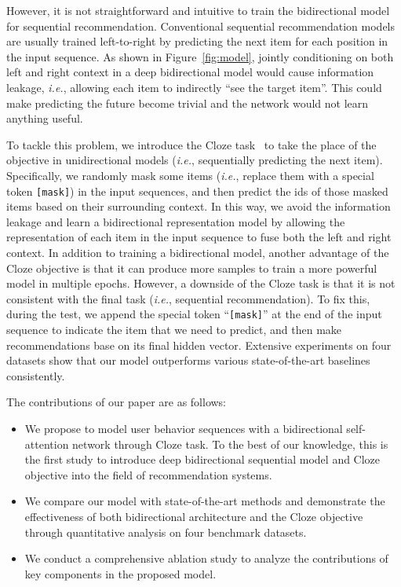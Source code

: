 However, it is not straightforward and intuitive to train the bidirectional model for sequential recommendation. Conventional sequential recommendation models are usually trained left-to-right by predicting the next item for each position in the input sequence. As shown in Figure~\ref{fig:model}, jointly conditioning on both left and right context in a deep bidirectional model would cause information leakage, \textit{i.e.}, allowing each item to indirectly ``see the target item''. This could make predicting the future become trivial and the network would not learn anything useful.

To tackle this problem, we introduce the Cloze task~\cite{Devlin:2018:BERT,Wilson:Cloze} to take the place of the objective in unidirectional models (\textit{i.e.}, sequentially predicting the next item). Specifically, we randomly mask some items (\textit{i.e.}, replace them with a special token \texttt{[mask]}) in the input sequences, and then predict the ids of those masked items based on their surrounding context. In this way, we avoid the information leakage and learn a bidirectional representation model by allowing the representation of each item in the input sequence to fuse both the left and right context. In addition to training a bidirectional model, another advantage of the Cloze objective is that it can produce more samples to train a more powerful model in multiple epochs. However, a downside of the Cloze task is that it is not consistent with the final task (\textit{i.e.}, sequential recommendation). To fix this, during the test, we append the special token ``\texttt{[mask]}'' at the end of the input sequence to indicate the item that we need to predict, and then make recommendations base on its final hidden vector. Extensive experiments on four datasets show that our model outperforms various state-of-the-art baselines consistently.

The contributions of our paper are as follows:

\begin{itemize}
    \item We propose to model user behavior sequences with a bidirectional self-attention network through Cloze task. To the best of our knowledge, this is the first study to introduce deep bidirectional sequential model and Cloze objective into the field of recommendation systems.
    \item We compare our model with state-of-the-art methods and demonstrate the effectiveness of both bidirectional architecture and the Cloze objective through quantitative analysis on four benchmark datasets.
    \item We conduct a comprehensive ablation study to analyze the contributions of key components in the proposed model. 
\end{itemize}

